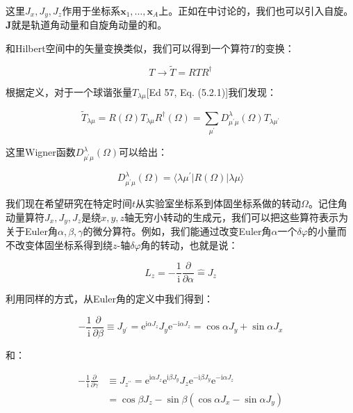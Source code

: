 这里$J_{x},J_{y},J_{z}$作用于坐标系$\boldsymbol{x}_{1},\dots,\boldsymbol{x}_{A}$上。正如在\cite{Ed57}中讨论的，我们也可以引入自旋。$\boldsymbol{J}$就是轨道角动量和自旋角动量的和。

和Hilbert空间中的矢量变换类似，我们可以得到一个算符$T$的变换：

\begin{equation}
T\rightarrow\tilde{T}=RTR^{\dagger}
\end{equation}

根据定义，对于一个球谐张量$T_{\lambda\mu}${[}Ed 57, Eq. (5.2.1){]}我们发现：

\begin{equation}
\tilde{T}_{\lambda\mu}=R(\Omega)T_{\lambda\mu}R^{\dagger}(\Omega)=\sum_{\mu^{\prime}}D^{\lambda}_{\mu^{\prime}\mu}(\Omega)T_{\lambda\mu^{\prime}}
\end{equation}

这里Wigner函数$D^{\lambda}_{\mu^{\prime}\mu}(\Omega)$可以给出：

\begin{equation}
D^{\lambda}_{\mu^{\prime}\mu}(\Omega)=\langle\lambda\mu^{\prime}|R(\Omega)|\lambda\mu\rangle
\end{equation}

我们现在希望研究在特定时间$t$从实验室坐标系到体固坐标系做的转动$\Omega$。记住角动量算符$J_{x},J_{y},J_{z}$是绕$x,y,z$轴无穷小转动的生成元，我们可以把这些算符表示为关于Euler角$\alpha,\beta,\gamma$的微分算符。例如，我们能通过改变Euler角$\alpha$一个$\delta\varphi$的小量而不改变体固坐标系得到绕$z$-轴$\delta\varphi$角的转动，也就是说：

\begin{equation}
L_{z}=-\frac{1}{\mathrm{i}}\frac{\partial}{\partial\alpha}\hat{=}J_{z}
\end{equation}

利用同样的方式，从Euler角的定义\cite{Ed57}中我们得到：

\begin{equation}
-\frac{1}{\mathrm{i}}\frac{\partial}{\partial\beta}\equiv J_{y^{\prime}}=\mathrm{e}^{\mathrm{i}\alpha J_{z}}J_{y}\mathrm{e}^{-\mathrm{i}\alpha J_{z}}=\cos\alpha J_{y}+\sin\alpha J_{x}
\end{equation}

和：

\begin{align}
-\frac{1}{\mathrm{i}}\frac{\partial}{\partial\gamma} & \equiv J_{z^{\prime\prime}}=\mathrm{e}^{\mathrm{i}\alpha J_{z}}\mathrm{e}^{\mathrm{i}\beta J_{y}}J_{z}\mathrm{e}^{-\mathrm{i}\beta J_{y}}\mathrm{e}^{-\mathrm{i}\alpha J_{z}}\nonumber \\
 & =\cos\beta J_{z}-\sin\beta(\cos\alpha J_{x}-\sin\alpha J_{y})
\end{align}

